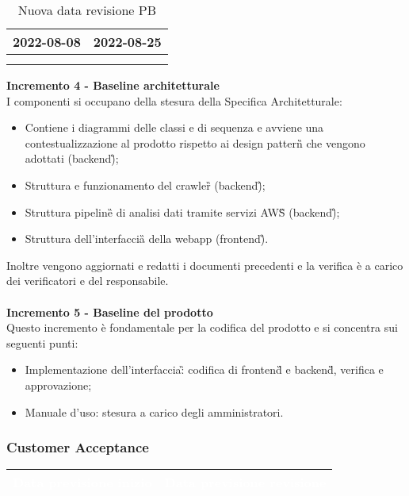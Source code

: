 {{{\begin{longtable}{C{.4\freewidth} C{.4\freewidth}}
        2022-08-08 & 2022-08-25 \\
        \bottomrule
        \\
        \caption{Nuova data revisione PB}
        \end{longtable}
    \textbf{Incremento 4 - Baseline architetturale} \\
    I componenti si occupano della stesura della Specifica Architetturale: 
    \begin{itemize}
        \item Contiene i diagrammi delle classi e di sequenza e avviene una contestualizzazione al prodotto rispetto ai design pattern\G{} che vengono adottati (backend\G);
        \item Struttura e funzionamento del crawler\G{} (backend\G);
        \item Struttura pipeline\G{} di analisi dati tramite servizi AWS\G{} (backend\G);
        \item Struttura dell'interfaccia\G{} della webapp (frontend\G).
    \end{itemize}
    Inoltre vengono aggiornati e redatti i documenti precedenti e la verifica è a carico dei verificatori e del responsabile.\\ \\
    \textbf{Incremento 5 - Baseline del prodotto} \\
    Questo incremento è fondamentale per la codifica del prodotto e si concentra sui seguenti punti:
    \begin{itemize}
        \item Implementazione dell'interfaccia\G: codifica di frontend\G{} e backend\G{}, verifica e approvazione;
        \item Manuale d'uso: stesura a carico degli amministratori.
    \end{itemize}
    }
\newpage
    \subsubsection{Customer Acceptance} {
        \setlength{\freewidth}{\dimexpr\textwidth-30\tabcolsep}
        \renewcommand{\arraystretch}{1.0}
        \setlength{\aboverulesep}{0pt}
        \setlength{\belowrulesep}{0pt}
        \begin{longtable}{C{.4\freewidth} C{.4\freewidth}}
        \toprule
        \textcolor{white}{\textbf{Data previsione inizio}}&
        \textcolor{white}{\textbf{Data previsione revisione}} \\
        \toprule
        \endhead
            

\end{longtable}}}}
